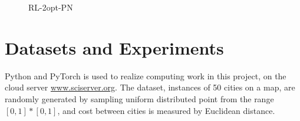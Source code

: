 \documentclass[twocolumn]{article}
\begin{document}
\begin{figure}[H]
\caption{RL-2opt-PN}
\label{fig:rl2optpn}
\end{figure}

\section{Datasets and Experiments}
Python and PyTorch is used to realize computing work in this project, on the cloud server \url{www.sciserver.org}. The dataset, instances of 50 cities on a map,  are randomly generated by sampling uniform distributed point from the range $[0,1]*[0,1]$, and cost between cities is measured by Euclidean distance.
\end{document}
